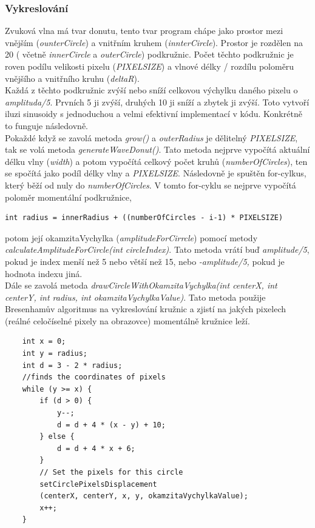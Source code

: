 \subsubsection{Vykreslování}
Zvuková vlna má tvar donutu, tento tvar program chápe jako prostor mezi vnějším (\textit{ounterCircle}) a vnitřním kruhem (\textit{innterCircle}). Prostor je rozdělen na 20 ( včetně \textit{innerCircle} a \textit{outerCircle}) podkružnic. Počet těchto podkružnic je roven podílu velikosti pixelu (\textit{PIXELSIZE}) a vlnové délky / rozdílu poloměru vnějšího a vnitřního kruhu (\textit{deltaR}). \\
Každá z těchto podkružnic zvýší nebo sníží celkovou výchylku daného pixelu o \textit{amplituda/5}. Prvních 5 ji zvýší, druhých 10 ji sníží a zbytek ji zvýší. Toto vytvoří iluzi sinusoidy s jednoduchou a velmi efektivní implementací v kódu. Konkrétně to funguje následovně.\\ 
Pokaždé když se zavolá metoda \textit{grow()} a \textit{outerRadius} je dělitelný \textit{PIXELSIZE}, tak se volá metoda \textit{generateWaveDonut()}. Tato metoda nejprve vypočítá aktuální délku vlny (\textit{width}) a potom vypočítá celkový počet kruhů (\textit{numberOfCircles}), ten se spočítá jako podíl délky vlny a \textit{PIXELSIZE}. Následovně je spuštěn for-cylkus, který běží od nuly do \textit{numberOfCircles}. V tomto for-cyklu se nejprve vypočítá poloměr momentální podkružnice,
\begin{verbatim}
int radius = innerRadius + ((numberOfCircles - i-1) * PIXELSIZE)
\end{verbatim}
potom její okamzitaVychylka (\textit{amplitudeForCirrcle}) pomocí metody \textit{calculateAmplitudeForCircle(int circleIndex)}. Tato metoda vrátí buď \textit{amplitude/5}, pokud je index menší než 5 nebo větší než 15, nebo 
\textit{-amplitude/5,} pokud je hodnota indexu jiná. \\
Dále se zavolá metoda \textit{drawCircleWithOkamzitaVychylka(int centerX, int centerY, int radius, int okamzitaVychylkaValue)}\cite{algoritmus}. Tato metoda použije Bresenhamův algoritmus na vykreslování kružnic a zjistí na jakých pixelech (reálné celočíselné pixely na obrazovce) momentálně kružnice leží. 
\begin{verbatim}
    int x = 0;
    int y = radius;
    int d = 3 - 2 * radius;
    //finds the coordinates of pixels
    while (y >= x) {
        if (d > 0) {
            y--;
            d = d + 4 * (x - y) + 10;
        } else {
            d = d + 4 * x + 6;
        }
        // Set the pixels for this circle
        setCirclePixelsDisplacement
        (centerX, centerY, x, y, okamzitaVychylkaValue);
        x++;
    }
\end{verbatim}
